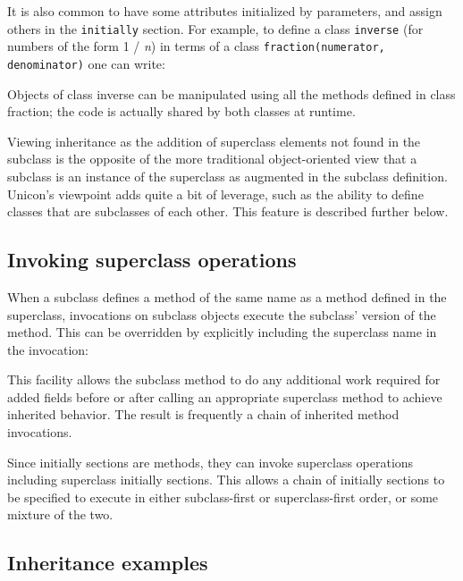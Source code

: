 \noindent
It is also common to have some attributes initialized by parameters, and
assign others in the \texttt{initially} section. For example, to define a
class \texttt{inverse} (for numbers of the form 1 / \textit{n}) in terms
of a class \texttt{fraction(numerator, denominator)} one can write: 


Objects of class inverse can be manipulated using all the methods
defined in class fraction; the code is actually shared by both classes
at runtime. 

Viewing inheritance as the addition of superclass elements not found in
the subclass is the opposite of the more traditional object-oriented
view that a subclass is an instance of the
superclass as augmented in the subclass definition.
Unicon's viewpoint adds quite a bit of leverage, such
as the ability to define classes that are subclasses of each other.
This feature is described further below. 

\subsection*{Invoking superclass operations}

When a subclass defines a
method of the same name as a method defined in the superclass,
invocations on subclass objects execute the
subclass' version of the
method. This can be overridden by explicitly
including the superclass name in the invocation:


This facility allows the subclass method to do any additional work
required for added fields before or after calling an appropriate
superclass method to achieve inherited behavior. The result is
frequently a chain of inherited method invocations. 

Since initially sections are methods, they can invoke superclass
operations including superclass initially sections. This allows a chain
of initially sections to be specified to execute in either
subclass-first or superclass-first order, or some mixture of the two. 

\subsection*{Inheritance examples}

